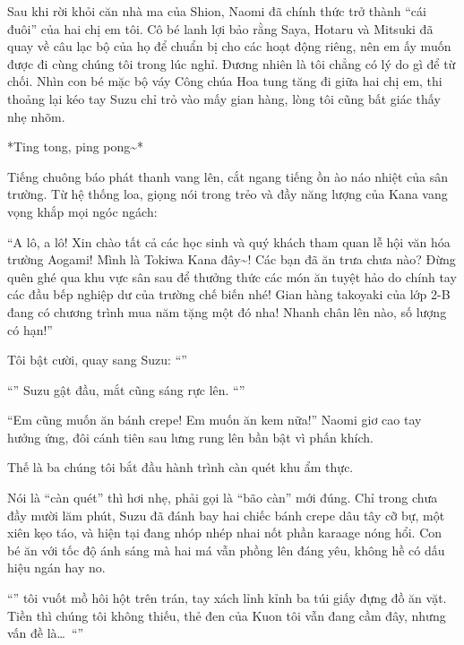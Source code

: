\documentclass[../main.tex]{subfiles}
\begin{document}
Sau khi rời khỏi căn nhà ma của Shion, Naomi đã chính thức trở thành ``cái đuôi'' của hai chị em tôi. Cô bé lanh lợi bảo rằng Saya, Hotaru và Mitsuki đã quay về câu lạc bộ của họ để chuẩn bị cho các hoạt động riêng, nên em ấy muốn được đi cùng chúng tôi trong lúc nghỉ. Đương nhiên là tôi chẳng có lý do gì để từ chối. Nhìn con bé mặc bộ váy Công chúa Hoa tung tăng đi giữa hai chị em, thi thoảng lại kéo tay Suzu chỉ trỏ vào mấy gian hàng, lòng tôi cũng bất giác thấy nhẹ nhõm.

*Ting tong, ping pong\~{}*

Tiếng chuông báo phát thanh vang lên, cắt ngang tiếng ồn ào náo nhiệt của sân trường. Từ hệ thống loa, giọng nói trong trẻo và đầy năng lượng của Kana vang vọng khắp mọi ngóc ngách:

``A lô, a lô! Xin chào tất cả các học sinh và quý khách tham quan lễ hội văn hóa trường Aogami! Mình là Tokiwa Kana đây\~{}! Các bạn đã ăn trưa chưa nào? Đừng quên ghé qua khu vực sân sau để thưởng thức các món ăn tuyệt hảo do chính tay các đầu bếp nghiệp dư của trường chế biến nhé! Gian hàng takoyaki của lớp 2-B đang có chương trình mua năm tặng một đó nha! Nhanh chân lên nào, số lượng có hạn!''

Tôi bật cười, quay sang Suzu: ``''

``'' Suzu gật đầu, mắt cũng sáng rực lên. ``''

``Em cũng muốn ăn bánh crepe! Em muốn ăn kem nữa!'' Naomi giơ cao tay hưởng ứng, đôi cánh tiên sau lưng rung lên bần bật vì phấn khích.

Thế là ba chúng tôi bắt đầu hành trình càn quét khu ẩm thực.

Nói là ``càn quét'' thì hơi nhẹ, phải gọi là ``bão càn'' mới đúng. Chỉ trong chưa đầy mười lăm phút, Suzu đã đánh bay hai chiếc bánh crepe dâu tây cỡ bự, một xiên kẹo táo, và hiện tại đang nhóp nhép nhai nốt phần karaage nóng hổi. Con bé ăn với tốc độ ánh sáng mà hai má vẫn phồng lên đáng yêu, không hề có dấu hiệu ngán hay no.

``'' tôi vuốt mồ hôi hột trên trán, tay xách lỉnh kỉnh ba túi giấy đựng đồ ăn vặt. Tiền thì chúng tôi không thiếu, thẻ đen của Kuon tôi vẫn đang cầm đây, nhưng vấn đề là\dots\ ``''
\end{document}

